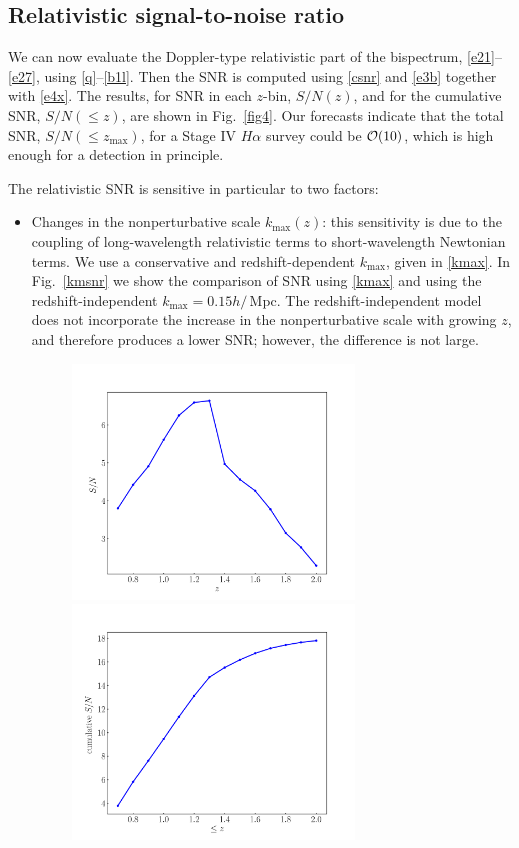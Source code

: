 \subsection{Relativistic signal-to-noise ratio}
%
%
We can now evaluate the Doppler-type relativistic part of the bispectrum, \eqref{e21}--\eqref{e27}, using \eqref{q}--\eqref {b1l}. 
Then the SNR is computed using  \eqref{csnr}  and \eqref{e3b} together with \eqref{e4x}.
The results, for SNR in each $z$-bin, $S/N(z)$, and for the cumulative SNR, $S/N(\leq z)$, are shown in Fig.~\ref{fig4}.
Our forecasts indicate that the total SNR, $S/N(\leq z_{\mathrm{max}})$, for a Stage IV $H\alpha$  survey could be ${\cal O}(10)$, which  is high enough for a detection in principle.

The relativistic SNR is sensitive in particular to two factors:
\begin{itemize}
\item 
Changes in the nonperturbative scale  $k_{\mathrm{max}}(z)$: this sensitivity is due to the coupling of long-wavelength relativistic terms to short-wavelength Newtonian terms. 
We use a conservative and redshift-dependent $k_{\mathrm{max}}$, given in \eqref{kmax}. In  Fig.~\ref{kmsnr}
we show the comparison of SNR using \eqref{kmax} and using the redshift-independent $k_{\mathrm{max}}=0.15h/\,$Mpc. The redshift-independent model does not incorporate  the increase in the nonperturbative scale with growing $z$, and therefore produces a lower SNR; however, the difference is not large.
\begin{figure}[ht]
\centering
\includegraphics[width=7.5cm]{fig/snrDoppler-eps-converted-to}
\includegraphics[width=7.5cm]{fig/CumulativesnrDoppler-eps-converted-to}

\end{figure}
\end{itemize}
